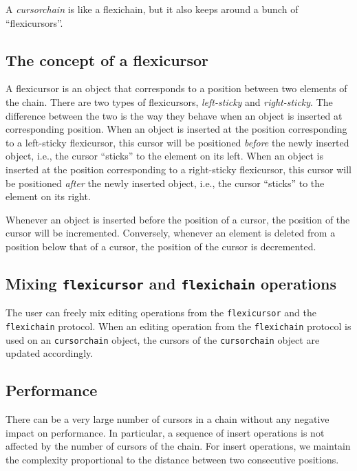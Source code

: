 \documentclass[11pt]{article}
\begin{document}
A \textit{cursorchain} is like a flexichain, but it also keeps around
a bunch of ``flexicursors''.

\subsection{The concept of a flexicursor} 

A flexicursor is an object that corresponds to a position between two
elements of the chain.  There are two types of flexicursors,
\emph{left-sticky} and \emph{right-sticky}.  The difference between
the two is the way they behave when an object is inserted at
corresponding position. When an object is inserted at the position
corresponding to a left-sticky flexicursor, this cursor will be
positioned \emph{before} the newly inserted object, i.e., the cursor
``sticks'' to the element on its left.  When an object is inserted at
the position corresponding to a right-sticky flexicursor, this cursor
will be positioned \emph{after} the newly inserted object, i.e., the
cursor ``sticks'' to the element on its right.

Whenever an object is inserted before the position of a
cursor, the position of the cursor will be incremented.  Conversely,
whenever an element is deleted from a position below that of a cursor,
the position of the cursor is decremented.

\subsection{Mixing \texttt{flexicursor} and \texttt{flexichain} operations}

The user can freely mix editing operations from the
\texttt{flexicursor} and the \texttt{flexichain} protocol.  When an
editing operation from the \texttt{flexichain} protocol is used on an
\texttt{cursorchain} object, the cursors of the \texttt{cursorchain}
object are updated accordingly.

\subsection{Performance}

There can be a very large number of cursors in a chain without any
negative impact on performance.  In particular, a sequence of insert
operations is not affected by the number of cursors of the chain.
For insert operations, we maintain the complexity proportional to the
distance between two consecutive positions.  
\end{document}
